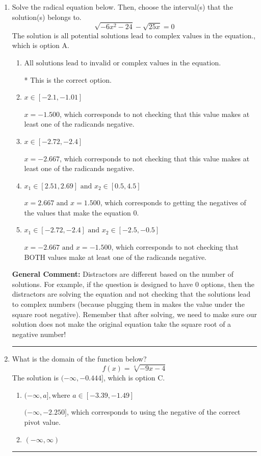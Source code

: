 \documentclass{extbook}[14pt]
\newcommand{\litem}[1]{\item #1

\rule{\textwidth}{0.4pt}}
\begin{document}
\begin{enumerate}\litem{
Solve the radical equation below. Then, choose the interval(s) that the solution(s) belongs to.
\[ \sqrt{-6 x^2 - 24} - \sqrt{25 x} = 0 \]The solution is \( \text{all potential solutions lead to complex values in the equation.} \), which is option A.\begin{enumerate}[label=\Alph*.]
\item \( \text{All solutions lead to invalid or complex values in the equation.} \)

* This is the correct option.
\item \( x \in [-2.1,-1.01] \)

$x = -1.500$, which corresponds to not checking that this value makes at least one of the radicands negative.
\item \( x \in [-2.72,-2.4] \)

$x = -2.667$, which corresponds to not checking that this value makes at least one of the radicands negative.
\item \( x_1 \in [2.51, 2.69] \text{ and } x_2 \in [0.5,4.5] \)

$x = 2.667 \text{ and } x = 1.500$, which corresponds to getting the negatives of the values that make the equation 0.
\item \( x_1 \in [-2.72, -2.4] \text{ and } x_2 \in [-2.5,-0.5] \)

$x = -2.667 \text{ and } x = -1.500$, which corresponds to not checking that BOTH values make at least one of the radicands negative.
\end{enumerate}

\textbf{General Comment:} Distractors are different based on the number of solutions. For example, if the question is designed to have 0 options, then the distractors are solving the equation and not checking that the solutions lead to complex numbers (because plugging them in makes the value under the square root negative). Remember that after solving, we need to make sure our solution does not make the original equation take the square root of a negative number!
}
\litem{
What is the domain of the function below?
\[ f(x) = \sqrt[4]{-9 x - 4} \]The solution is \( (-\infty, -0.444] \), which is option C.\begin{enumerate}[label=\Alph*.]
\item \( (-\infty, a], \text{where } a \in [-3.39, -1.49] \)

$(-\infty, -2.250]$, which corresponds to using the negative of the correct pivot value.
\item \( (-\infty, \infty) \)


\end{enumerate}}
\end{enumerate}
\end{document}
